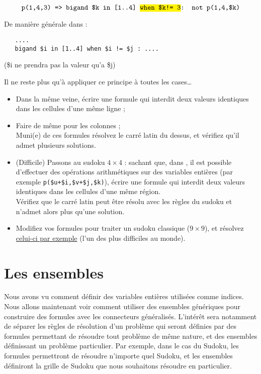 \[\texttt{p(1,4,3) => bigand \$k in [1..4] \hl{when \$k!= 3}: not p(1,4,\$k)}\]

De manière générale dans : 
\begin{verbatim}
   ....
   bigand $i in [1..4] when $i != $j : ....
\end{verbatim}
(\$i ne prendra pas la valeur qu'a \$j)

Il ne reste plus qu'à appliquer ce principe à toutes les cases\ldots

\begin{itemize}
    \item Dans la même veine, écrire une formule qui interdit deux valeurs identiques dans les cellules d'une même ligne ;
    \item Faire de même pour les colonnes ;\\
    Muni(e) de ces formules résolvez le carré latin du dessus, et vérifiez qu'il admet plusieurs solutions. 
    \item (Difficile) Passons au sudoku $4\times 4$ : sachant que, dans \touist, il est possible d'effectuer des opérations arithmétiques sur des variables entières (par exemple \texttt{p(\$u+\$i,\$v+\$j,\$k)}), écrire une formule qui interdit deux valeurs identiques dans les cellules d'une même région.\\
    Vérifiez que le carré latin peut être résolu avec les règles du sudoku et n'admet alors plus qu'une solution. 
    
\item Modifiez vos formules pour traiter un sudoku classique ($9\times 9$), et résolvez \href{http://puzzling.stackexchange.com/questions/252/how-do-i-solve-the-worlds-hardest-sudoku}{celui-ci par exemple} (l'un des plus difficiles au monde). 
\end{itemize}

\section{Les ensembles}

Nous avons vu comment définir des variables entières utilisées comme indices.
Nous allons maintenant voir comment utiliser des ensembles génériques pour construire des formules avec les connecteurs généralisés. L'intérêt sera notamment de séparer les règles de résolution d'un problème qui seront définies par des formules permettant de résoudre tout problème de même nature, et des ensembles définissant un problème particulier. Par exemple, dans le cas du Sudoku, les formules permettront de résoudre n'importe quel Sudoku, et les ensembles définiront la grille de Sudoku que nous souhaitons résoudre en particulier.\\

